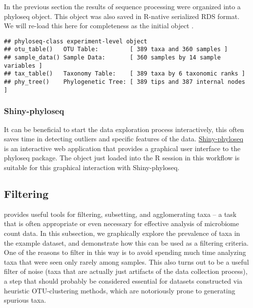 In the previous section the results of  sequence processing
were organized into a phyloseq object.
This object was also saved in R-native serialized RDS format.
We will re-load this here for completeness as the initial object .

\begin{knitrout}
\color{fgcolor}\begin{kframe}
\begin{alltt}
\hlstd{(}\hlstd{)}
\hlstd{(}\hlstd{)}
 \hlkwb{=} \hlstd{(}\hlstd{)}
\end{alltt}
\begin{verbatim}
## phyloseq-class experiment-level object
## otu_table()   OTU Table:         [ 389 taxa and 360 samples ]
## sample_data() Sample Data:       [ 360 samples by 14 sample variables ]
## tax_table()   Taxonomy Table:    [ 389 taxa by 6 taxonomic ranks ]
## phy_tree()    Phylogenetic Tree: [ 389 tips and 387 internal nodes ]
\end{verbatim}
\end{kframe}
\end{knitrout}


\subsubsection*{Shiny-phyloseq}

It can be beneficial to start the data exploration
process interactively, this often saves time
in detecting outliers and specific features of the data.
\href{http://joey711.github.io/shiny-phyloseq/}{Shiny-phyloseq}
\cite{mcmurdie2015}
is an interactive web application that provides a graphical user interface to
the phyloseq package.
The object just loaded into the R session in this workflow
is  suitable for this graphical interaction with Shiny-phyloseq.


\subsection*{Filtering}

provides useful tools for filtering, subsetting, and agglomerating taxa --
a task that is often appropriate or even necessary
for effective analysis of microbiome count data.
In this subsection, we graphically explore the prevalence of taxa
in the example dataset,
and demonstrate how this can be used as a filtering criteria.
One of the reasons to filter in this way
is to avoid spending much time analyzing taxa
that were seen only rarely among  samples.
This also turns out to be a useful filter of noise
(taxa that are actually just artifacts of the data collection process),
a step that should probably be considered essential for datasets constructed
via heuristic OTU-clustering methods,
which are notoriously prone to generating spurious taxa.


